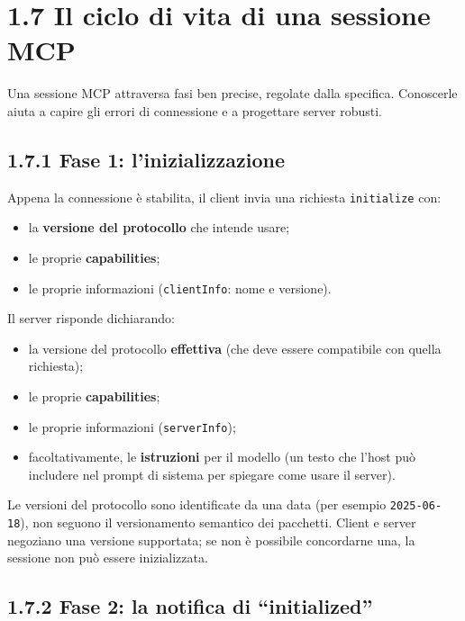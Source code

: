 \documentclass[
  italian,
  10pt,
]{book}
\providecommand{\tightlist}{%
  \setlength{\itemsep}{0pt}\setlength{\parskip}{0pt}}
\begin{document}
\section{1.7 Il ciclo di vita di una sessione
MCP}\label{il-ciclo-di-vita-di-una-sessione-mcp}

Una sessione MCP attraversa fasi ben precise, regolate dalla specifica.
Conoscerle aiuta a capire gli errori di connessione e a progettare
server robusti.

\subsection{1.7.1 Fase 1:
l'inizializzazione}\label{fase-1-linizializzazione}

Appena la connessione è stabilita, il client invia una richiesta
\texttt{initialize} con:

\begin{itemize}
\tightlist
\item
  la \textbf{versione del protocollo} che intende usare;
\item
  le proprie \textbf{capabilities};
\item
  le proprie informazioni (\texttt{clientInfo}: nome e versione).
\end{itemize}

Il server risponde dichiarando:

\begin{itemize}
\tightlist
\item
  la versione del protocollo \textbf{effettiva} (che deve essere
  compatibile con quella richiesta);
\item
  le proprie \textbf{capabilities};
\item
  le proprie informazioni (\texttt{serverInfo});
\item
  facoltativamente, le \textbf{istruzioni} per il modello (un testo che
  l'host può includere nel prompt di sistema per spiegare come usare il
  server).
\end{itemize}

Le versioni del protocollo sono identificate da una data (per esempio
\texttt{2025-06-18}), non seguono il versionamento semantico dei
pacchetti. Client e server negoziano una versione supportata; se non è
possibile concordarne una, la sessione non può essere inizializzata.

\subsection{1.7.2 Fase 2: la notifica di
``initialized''}\label{fase-2-la-notifica-di-initialized}
\end{document}
